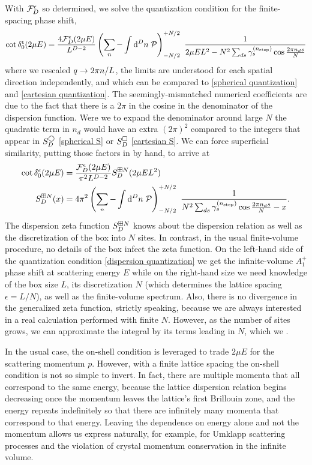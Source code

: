 With $\mathcal{F}_D^\epsilon$ so determined, we solve the quantization condition for the finite-spacing phase shift,
\begin{align}
    \cot \delta_0^\epsilon(2\mu E)
    =
    \frac{4\mathcal{F}_D^\epsilon(2\mu E)}{L^{D-2}}
    \left(\sum_n - \int \mathrm{d}^D n\; \mathcal{P} \right)_{-N/2}^{+N/2}\  \frac{1}{2\mu E L^2 - N^2 \sum_{ds} \gamma^{({n_\text{step}})}_s \cos \frac{2\pi n_d s}{N}}
\end{align}
where we rescaled $q\rightarrow 2\pi n/L$, the limits are understood for each spatial direction independently, and which can be compared to \eqref{spherical quantization} and \eqref{cartesian quantization}.  The seemingly-mismatched numerical coefficients are due to the fact that there is a $2\pi$ in the cosine in the denominator of the dispersion function.
Were we to expand the denominator around large $N$ the quadratic term in $n_d$ would have an extra $(2\pi)^2$ compared to the integers that appear in $S^\bigcirc_D$ \eqref{spherical S} or $S^\square_D$ \eqref{cartesian S}.  We can force superficial similarity, putting those factors in by hand, to arrive at
\begin{align}
    \label{eq:dispersion quantization}
    \cot \delta_0^{\epsilon}( 2\mu E ) &= \frac{\mathcal{F}_D^\epsilon(2\mu E)}{\pi^2 L^{D-2}} S^{\boxplus N}_{D}(2\mu E L^2)
    \\
    \label{eq:dispersion S}
    S^{\boxplus N}_{D}( x )
    &=
    4\pi^2
    \left(\sum_n - \int \mathrm{d}^D n\; \mathcal{P} \right)_{-N/2}^{+N/2}\  \frac{1}{N^2 \sum_{ds} \gamma^{({n_\text{step}})}_s \cos \frac{2\pi n_d s}{N} - x}.
\end{align}
The dispersion zeta function $S^{\boxplus N}_{D}$ knows about the dispersion relation as well as the discretization of the box into $N$ sites.
In contrast, in the usual finite-volume procedure, no details of the box infect the zeta function.
On the left-hand side of the quantization condition \eqref{dispersion quantization} we get the infinite-volume $A_1^+$ phase shift at scattering energy $E$ while on the right-hand size we need knowledge of the box size $L$, its discretization $N$ (which determines the lattice spacing $\epsilon=L/N$), as well as the finite-volume spectrum.
Also, there is no divergence in the generalized zeta function, strictly speaking, because we are always interested in a real calculation performed with finite $N$.
However, as the number of sites grows, we can approximate the integral by its terms leading in $N$, which we .

In the usual case, the on-shell condition is leveraged to trade $2\mu E$ for the scattering momentum $p$.  However, with a finite lattice spacing the on-shell condition is not so simple to invert.
In fact, there are multiple momenta that all correspond to the same energy, because the lattice dispersion relation begins decreasing once the momentum leaves the lattice's first Brillouin zone, and the energy repeats indefinitely so that there are infinitely many momenta that correspond to that energy.
Leaving the dependence on energy alone and not the momentum allows us express naturally, for example, for Umklapp scattering processes and the violation of crystal momentum conservation in the infinite volume.

